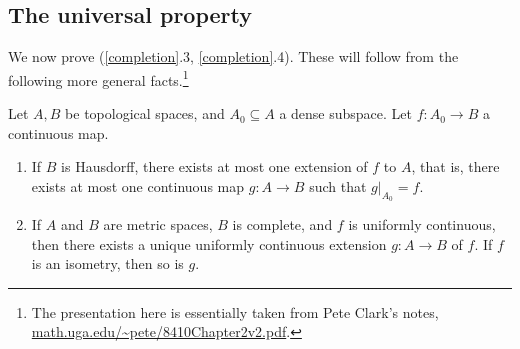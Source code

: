
\subsection{The universal property}

We now prove (\ref{completion}.3, \ref{completion}.4). These will
follow from the following more general facts.\footnote{The
  presentation here is essentially taken from Pete Clark's notes,
  \url{math.uga.edu/~pete/8410Chapter2v2.pdf}.}

\begin{lemma}
  Let $A,B$ be topological spaces, and $A_0 \subseteq A$ a dense
  subspace. Let $f : A_0 \to B$ a continuous map.
  \begin{enumerate}
  \item If $B$ is Hausdorff, there exists at most one extension of $f$
    to $A$, that is, there exists at most one continuous map $g : A
    \to B$ such that $g|_{A_0} = f$.
  \item If $A$ and $B$ are metric spaces, $B$ is complete, and $f$ is
    uniformly continuous, then there exists a unique uniformly
    continuous extension $g : A \to B$ of $f$. If $f$ is an isometry,
    then so is $g$.
  \end{enumerate}
\end{lemma}

